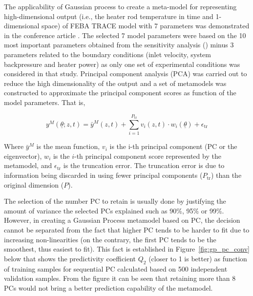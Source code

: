 \documentclass[11pt,titlepage]{article}
\begin{document}
The applicability of Gaussian process to create a meta-model for representing 
high-dimensional output (i.e., the heater rod temperature in time and 
1-dimensional space) of FEBA TRACE model with 7 parameters was demonstrated 
in the conference article \cite{Wicaksono2016}. The selected 7 model parameters 
were based on the 10 most important parameters obtained from the sensitivity 
analysis (\cite{Wicaksono2014b, Wicaksono2015a}) minus 3 parameters related to 
the boundary conditions (inlet velocity, system backpressure and heater power)
as only one set of experimental conditions was considered in that study.
Principal component analysis (PCA) was carried out to reduce the 
high dimensionality of the output and a set of metamodels was constructed to 
approximate the principal component scores as function of the model parameters. 
That is,

\begin{equation}
	y^M(\underline{\theta};z,t) = \bar{y}^M(z,t) + \sum_{i=1}^{P_\text{tr}} v_i(z,t) \cdot w_i(\underline{\theta}) + \epsilon_\text{tr}
\end{equation}

Where $\bar{y}^M$  is the mean function, $v_i$ is the i-th principal component 
(PC or the eigenvector), $w_i$ is the $i$-th principal component score 
represented by the metamodel, and $\epsilon_\text{tr}$ is the truncation 
error. The truncation error is due to information being discarded in using fewer 
principal components ($P_\text{tr}$) than the original dimension ($P$).

The selection of the number PC to retain is usually done by justifying the 
amount of variance the selected PCs explained such as 90\%, 95\% or 99\%. 
However, in creating a Gaussian Process metamodel based on PC, the 
decision cannot be separated from the fact that higher PC tends to be 
harder to fit due to increasing non-linearities (on the contrary, 
the first PC tends to be the smoothest, thus easiest to fit). 
This fact is established in Figure~\ref{fig:gp_pc_conv} below that shows the 
predictivity coefficient $Q_2$ (closer to 1 is better) as function of 
training samples for sequential PC calculated based on 500 independent 
validation samples. From the figure it can be seen that retaining more than 
8 PCs would not bring a better prediction capability of the metamodel.
\end{document}
